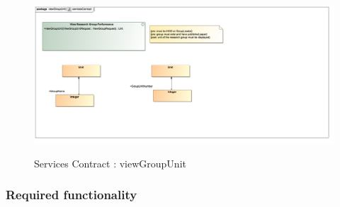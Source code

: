 \documentclass{article}
\begin{document}
		\begin{figure}[H]
			\includegraphics[width=\textwidth]{Vuyani_Diagrams/servicesContractViewgroupUnit.jpg}  \\
			\caption{Services Contract : viewGroupUnit}
		\end{figure}

	\subsubsection{Required functionality}
	
\end{document}
